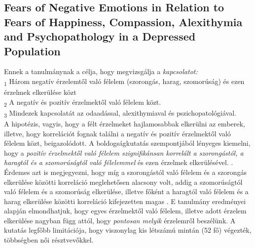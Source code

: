 \subsection*{Fears of Negative Emotions in Relation to Fears of Happiness, Compassion,
	Alexithymia and Psychopathology in a Depressed Population \parencite{gilbert_2014}}
 Ennek a tanulmánynak a célja, hogy megvizsgálja a \textit{kapcsolatot:}\\
 \textsubscript{1} Három negatív érzelemtől való félelem (szorongás, harag, szomorúság) és ezen érzelmek elkerülése közt \\
 \textsubscript{2} A negatív és pozitív érzelmektől való félelem közt.\\
 \textsubscript{3} Mindezek kapcsolatát az odaadással, alexithymiaval és pszichopatológiával.\\
 A hipotézis, vagyis, hogy a félt érzelmeket hajlamosabbak elkerülni az emberek, illetve, hogy korrelációt fognak találni a negatív és pozitív érzelmektől való félelem közt, beigazolódott. A boldogságkutatás szempontjából lényeges kiemelni, hogy a \textit{pozitív érzelmektől való félelem szignifikánsan korrelált a szorongástól, a haragtól és a szomorúságtól való félelemmel} és ezen érzelmek elkerülésével. \parencite{gilbert_2014}. Érdemes azt is megjegyezni, hogy míg a szorongástól való félelem és a szorongás elkerülése közötti korreláció meglehetősen alacsony volt, addig a szomorúságtól való félelem és a szomorúság elkerülése, illetve főként a haragtól való félelem és a harag elkerülése közötti korreláció kifejezetten magas \parencite{gilbert_2014}. E tanulmány eredményei alapján elmondhatjuk, hogy egyes érzelmektől való félelem, illetve adott érzelem elkerülése nagyban függ attól, hogy \textit{pontosan melyik} érzelemről beszélünk. A kutatás legfőbb limitációja, hogy viszonylag kis létszámú mintán (52 fő) végezték, többségben női résztvevőkkel.
 
